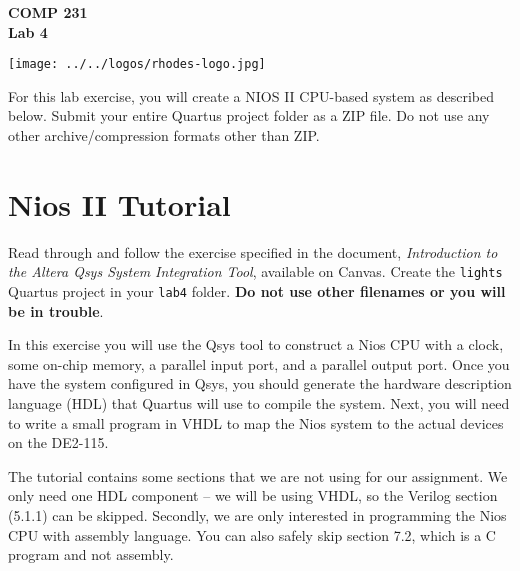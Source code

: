 \documentclass[10pt]{article}
\begin{document}
\hspace{-5mm}
\begin{minipage}{0.65\linewidth}
  \textbf{{\Large COMP 231\\Lab 4}}
\end{minipage}
\begin{minipage}{0.35\linewidth}
  \texttt{[image: ../../logos/rhodes-logo.jpg]}
\end{minipage}

\vspace{.5in}

\noindent For this lab exercise, you will create a NIOS II CPU-based
system as described below. Submit your entire Quartus project folder
as a ZIP file. Do not use any other archive/compression
formats other than ZIP. \\


\section{Nios II Tutorial}

Read through and follow the exercise specified in the document, {\em
  Introduction to the Altera Qsys System Integration Tool}, available on
Canvas. Create the {\tt lights} Quartus project in your {\tt lab4} folder. {\bf Do
not use other filenames or you will be in trouble}.

In this exercise you will use the Qsys tool to construct a Nios CPU with a
clock, some on-chip memory, a parallel input port, and a parallel output port.
Once you have the system configured in Qsys, you should generate the hardware
description language (HDL) that Quartus will use to compile the system.  Next,
you will need to write a small program in VHDL to map the Nios system to the
actual devices on the DE2-115.

The tutorial contains some sections that we are not using for our assignment.
We only need one HDL component -- we will be using VHDL, so the Verilog
section (5.1.1) can be skipped. Secondly, we are only interested in programming
the Nios CPU with assembly language. You can also safely skip section 7.2,
which is a C program and not assembly.
\end{document}
